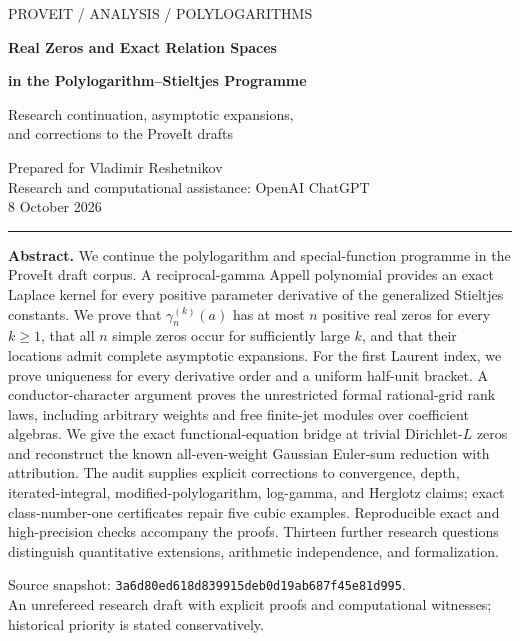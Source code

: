\documentclass[11pt,a4paper]{article}
\theoremstyle{definition}
\theoremstyle{remark}
\numberwithin{equation}{section}
\begin{document}
\begin{titlepage}
\thispagestyle{empty}
\setlength{\parindent}{0pt}
{\large\sffamily\color{Teal}PROVEIT \quad / \quad ANALYSIS \quad / \quad POLYLOGARITHMS\par}
\vspace{20mm}
{\huge\bfseries\color{Ink}
Real Zeros and Exact Relation Spaces\par}
\vspace{4mm}
{\LARGE\bfseries\color{Ink}
in the Polylogarithm--Stieltjes Programme\par}
\vspace{8mm}
{\large
Research continuation, asymptotic expansions,\\
and corrections to the ProveIt drafts\par}
\vspace{13mm}
{\normalsize
Prepared for Vladimir Reshetnikov\\
Research and computational assistance: OpenAI ChatGPT\\
8 October 2026\par}
\vspace{12mm}
{\color{Teal}\rule{\linewidth}{.8pt}\par}
\vspace{3mm}
\noindent\textbf{Abstract.}
We continue the polylogarithm and special-function programme in the
ProveIt draft corpus. A reciprocal-gamma Appell polynomial provides
an exact Laplace kernel for every positive parameter derivative of
the generalized Stieltjes constants. We prove that
$\gamma_n^{(k)}(a)$ has at most $n$ positive real zeros for every
$k\geq1$, that all $n$ simple zeros occur for sufficiently large $k$,
and that their locations admit complete asymptotic expansions.
For the first Laurent index, we prove uniqueness for every derivative
order and a uniform half-unit bracket. A conductor-character
argument proves the unrestricted formal rational-grid rank laws,
including arbitrary weights and free finite-jet modules over
coefficient algebras. We give the exact functional-equation bridge
at trivial Dirichlet-$L$ zeros and reconstruct the known all-even-weight
Gaussian Euler-sum reduction with attribution. The audit supplies
explicit corrections to convergence, depth, iterated-integral,
modified-polylogarithm, log-gamma, and Herglotz claims; exact
class-number-one certificates repair five cubic examples.
Reproducible exact and high-precision checks accompany the proofs.
Thirteen further research questions distinguish quantitative
extensions, arithmetic independence, and formalization.

\vfill
{\small\color{Muted}
Source snapshot:
\texttt{3a6d80ed618d839915deb0d19ab687f45e81d995}.\\
An unrefereed research draft with explicit proofs and computational
witnesses; historical priority is stated conservatively.\par}
\end{titlepage}
\begingroup
\small
\setlength{\parskip}{0pt}
\tableofcontents
\endgroup
\clearpage
{}
\end{document}
